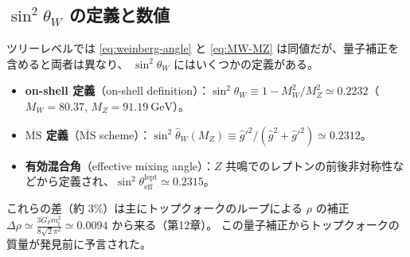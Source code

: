\documentclass[uplatex,dvipdfmx,a4paper,11pt,openany]{jsbook}
\newcommand{\term}[2]{\textbf{#1}（#2）}
\numberwithin{equation}{chapter}
\theoremstyle{definition}
\theoremstyle{plain}
\theoremstyle{remark}
\begin{document}
\subsection{$\sin^2\theta_W$ の定義と数値}
ツリーレベルでは \eqref{eq:weinberg-angle} と \eqref{eq:MW-MZ} は同値だが、量子補正を含めると両者は異なり、
$\sin^2\theta_W$ にはいくつかの定義がある。
\begin{itemize}
    \item \term{on-shell 定義}{on-shell definition}：$\sin^2\theta_W\equiv1-M_W^2/M_Z^2\simeq0.2232$（$M_W=80.37$, $M_Z=91.19\ \mathrm{GeV}$）。
    \item \term{$\overline{\mathrm{MS}}$ 定義}{$\overline{\mathrm{MS}}$ scheme}：$\sin^2\hat\theta_W(M_Z)\equiv\hat g'^2/(\hat g^2+\hat g'^2)\simeq0.2312$。
    \item \term{有効混合角}{effective mixing angle}：$Z$ 共鳴でのレプトンの前後非対称性などから定義され、$\sin^2\theta_{\mathrm{eff}}^{\mathrm{lept}}\simeq0.2315$。
\end{itemize}
これらの差（約 $3\%$）は主にトップクォークのループによる $\rho$ の補正
$\Delta\rho\simeq\frac{3G_Fm_t^2}{8\sqrt2\pi^2}\simeq0.0094$ から来る（第12章）。
この量子補正からトップクォークの質量が発見前に予言された。
\end{document}
